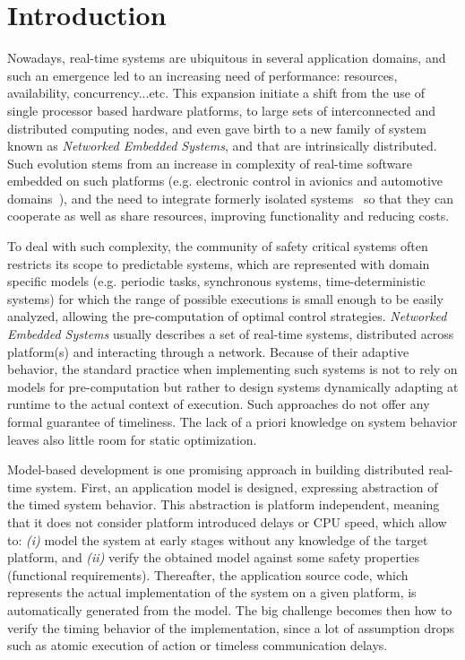 \section{Introduction}

Nowadays, real-time systems are ubiquitous in several application domains, 
and such an emergence led to an increasing need of performance: resources, 
availability, concurrency...etc. This expansion initiate a shift from the
use of single processor based hardware platforms, to large sets 
of interconnected and distributed computing nodes, and even gave birth to
a new family of system known as \emph{Networked Embedded Systems}, and
that are intrinsically distributed.
Such evolution stems from an increase in complexity of real-time software 
embedded on such platforms (e.g. electronic control in avionics 
and automotive domains~\cite{Charette09}), and the need to integrate 
formerly isolated systems~\cite{Kopetz:2004:IAD:1032662.1034360} so that 
they can cooperate as well as share resources, improving functionality 
and reducing costs.

To deal with such complexity, the community of safety critical systems 
often restricts its scope to predictable systems, which are represented 
with domain specific models (e.g. periodic tasks, synchronous systems, 
time-deterministic systems) for which the range of possible executions 
is small enough to be easily analyzed, allowing the pre-computation 
of optimal control strategies.
\emph{Networked Embedded Systems} usually describes a set of real-time systems, 
distributed across platform(s) and interacting through a network. 
Because of their adaptive behavior, the standard practice when implementing 
such systems is not to rely on models for pre-computation but rather to design
systems dynamically adapting at runtime to the actual context of execution.
Such approaches do not offer any formal guarantee of timeliness.
The lack of a priori knowledge on system behavior leaves also little room for 
static optimization.

Model-based development is one promising approach in building distributed 
real-time system. First, an application model is designed, expressing 
abstraction of the timed system behavior. This abstraction is platform 
independent, meaning that it does not consider platform introduced delays 
or CPU speed, which allow to: \emph{(i)} model the system at early stages 
without any knowledge of the target platform, and \emph{(ii)} verify 
the obtained model against some safety properties (functional requirements).
Thereafter, the application source code, which represents the actual 
implementation of the system on a given platform, 
is automatically generated from the model. The big challenge becomes then 
how to verify the timing behavior of the implementation, since a lot of 
assumption drops such as atomic execution of action or timeless communication delays. 

